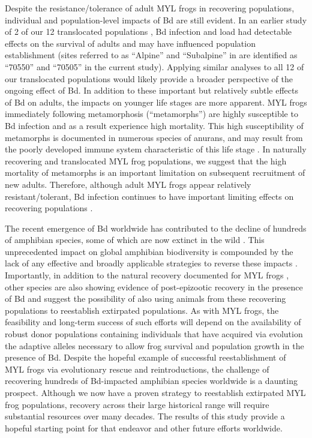 \documentclass[9pt,twocolumn,twoside,lineno]{pnas-new}
\begin{document}
Despite the resistance/tolerance of adult MYL frogs in recovering
populations, individual and population-level impacts of Bd are still
evident. In an earlier study of 2 of our 12 translocated populations
\citep{joseph2018}, Bd infection and load had detectable effects on the
survival of adults and may have influenced population establishment
(sites referred to as ``Alpine'' and ``Subalpine'' in \citep{joseph2018}
are identified as ``70550'' and ``70505'' in the current study).
Applying similar analyses to all 12 of our translocated populations
would likely provide a broader perspective of the ongoing effect of Bd.
In addition to these important but relatively subtle effects of Bd on
adults, the impacts on younger life stages are more apparent. MYL frogs
immediately following metamorphosis (``metamorphs'') are highly
susceptible to Bd infection \citep{ellison2018} and as a result
experience high mortality. This high susceptibility of metamorphs is
documented in numerous species of anurans, and may result from the
poorly developed immune system characteristic of this life stage
\citep{humphries2022}. In naturally recovering and translocated MYL frog
populations, we suggest that the high mortality of metamorphs is an
important limitation on subsequent recruitment of new adults. Therefore,
although adult MYL frogs appear relatively resistant/tolerant, Bd
infection continues to have important limiting effects on recovering
populations \citep[see also][]{hollanders2022}.

The recent emergence of Bd worldwide has contributed to the decline of
hundreds of amphibian species, some of which are now extinct in the wild
\citep{scheele2019}. This unprecedented impact on global amphibian
biodiversity is compounded by the lack of any effective and broadly
applicable strategies to reverse these impacts
\citep{garner2016, knapp2022}. Importantly, in addition to the natural
recovery documented for MYL frogs \citep{knapp2016}, other species are
also showing evidence of post-epizootic recovery in the presence of Bd
\citep{scheele2017, voyles2018} and suggest the possibility of also
using animals from these recovering populations to reestablish
extirpated populations. As with MYL frogs, the feasibility and long-term
success of such efforts will depend on the availability of robust donor
populations containing individuals that have acquired via evolution the
adaptive alleles necessary to allow frog survival and population growth
in the presence of Bd. Despite the hopeful example of successful
reestablishment of MYL frogs via evolutionary rescue and
reintroductions, the challenge of recovering hundreds of Bd-impacted
amphibian species worldwide is a daunting prospect. Although we now have
a proven strategy to reestablish extirpated MYL frog populations,
recovery across their large historical range will require substantial
resources over many decades. The results of this study provide a hopeful
starting point for that endeavor and other future efforts worldwide.
\end{document}
